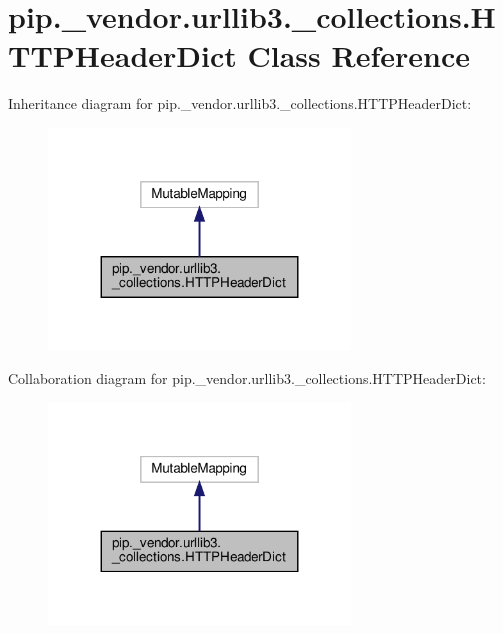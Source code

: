 \hypertarget{classpip_1_1__vendor_1_1urllib3_1_1__collections_1_1HTTPHeaderDict}{}\section{pip.\+\_\+vendor.\+urllib3.\+\_\+collections.\+H\+T\+T\+P\+Header\+Dict Class Reference}
\label{classpip_1_1__vendor_1_1urllib3_1_1__collections_1_1HTTPHeaderDict}


Inheritance diagram for pip.\+\_\+vendor.\+urllib3.\+\_\+collections.\+H\+T\+T\+P\+Header\+Dict\+:
\nopagebreak
\begin{figure}[H]
\begin{center}
\leavevmode
\includegraphics[width=227pt]{classpip_1_1__vendor_1_1urllib3_1_1__collections_1_1HTTPHeaderDict__inherit__graph}
\end{center}
\end{figure}


Collaboration diagram for pip.\+\_\+vendor.\+urllib3.\+\_\+collections.\+H\+T\+T\+P\+Header\+Dict\+:
\nopagebreak
\begin{figure}[H]
\begin{center}
\leavevmode
\includegraphics[width=227pt]{classpip_1_1__vendor_1_1urllib3_1_1__collections_1_1HTTPHeaderDict__coll__graph}
\end{center}
\end{figure}
